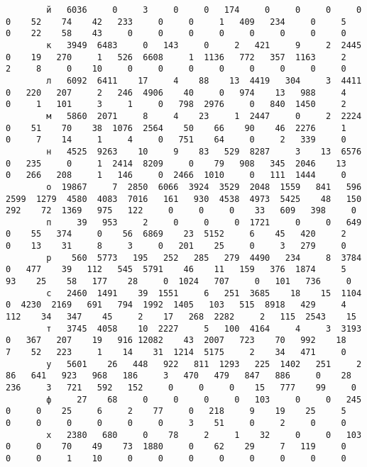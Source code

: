 \documentclass{article}
\begin{document}
\begin{landscape}
\begin{addmargin}{0em}
\begin{verbatim}
		й   6036     0     3     0     0   174     0     0     0     0     0    52    74    42   233     0     0     1   409   234     0     5     0    22    58    43     0     0     0     0     0     0     0     0
		к   3949  6483     0   143     0     2   421     9     2  2445     0    19   270     1   526  6608     1  1136   772   357  1163     2     2     8     0    10     0     0     0     0     0     0     0     0
		л   6092  6411    17     4    88    13  4419   304     3  4411     0   220   207     2   246  4906    40     0   974    13   988     4     0     1   101     3     1     0   798  2976     0   840  1450     2
		м   5860  2071     8     4    23     1  2447     0     2  2224     0    51    70    38  1076  2564    50    66    90    46  2276     1     0     7    14     1     4     0   751    64     0     2   339     0
		н   4525  9263    10     9    83   529  8287     3    13  6576     0   235     0     1  2414  8209     0    79   908   345  2046    13     0   266   208     1   146     0  2466  1010     0   111  1444     0
		о  19867     7  2850  6066  3924  3529  2048  1559   841   596  2599  1279  4580  4083  7016   161   930  4538  4973  5425    48   150   292    72  1369   975   122     0     0     0    33   609   398     0
		п     39   953     2     0     0     0  1721     0     0   649     0    55   374     0    56  6869    23  5152     6    45   420     2     0    13    31     8     3     0   201    25     0     3   279     0
		р    560  5773   195   252   285   279  4490   234     8  3784     0   477    39   112   545  5791    46    11   159   376  1874     5    93    25    58   177    28     0  1024   707     0   101   736     0
		с   2460  1491    39  1551     6   251  3685    18    15  1104     0  4230  2169   691   794  1992  1405   103   515  8918   429     4   112    34   347    45     2    17   268  2282     2   115  2543    15
		т   3745  4058    10  2227     5   100  4164     4     3  3193     0   367   207    19   916 12082    43  2007   723    70   992    18     7    52   223     1    14    31  1214  5175     2    34   471     0
		у   5601    26   448   922   811  1293   225  1402   251     2    86   641   923   968   186     3   470   479   847   886     0    28   236     3   721   592   152     0     0     0    15   777    99     0
		ф     27    68     0     0     0     0   103     0     0   245     0     0    25     6     2    77     0   218     9    19    25     5     0     0     0     0     0     0     3    51     0     2     0     0
		х   2380   680     0    78     2     1    32     0     0   103     0     0    70    49    73  1880     0    62    29     7   119     0     0     0     1    10     0     0     0     0     0     0     0     0

\end{verbatim}
\end{addmargin}
\end{landscape}
\end{document}
